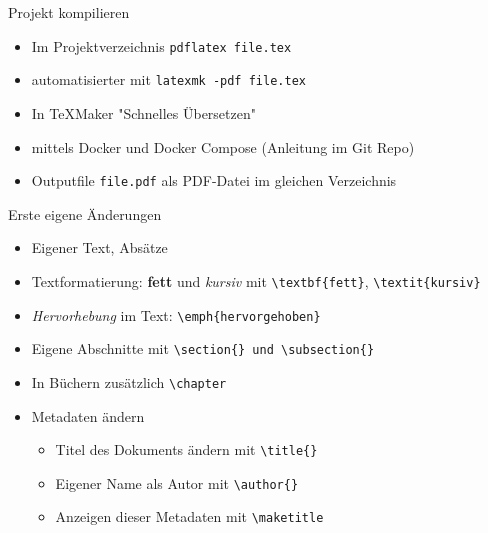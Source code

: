 \documentclass[presentation,aspectratio=169]{beamer}
\begin{document}
\begin{frame}[fragile]{Projekt kompilieren}
  \begin{itemize}
    \item Im Projektverzeichnis \verb|pdflatex file.tex|
    \item automatisierter mit \verb|latexmk -pdf file.tex|
    \item In \TeX{}Maker "Schnelles Übersetzen"
    \item mittels Docker und Docker Compose (Anleitung im Git Repo)
    \item Outputfile \verb|file.pdf| als PDF-Datei im gleichen Verzeichnis
  \end{itemize}
\end{frame}

\begin{frame}[fragile]{Erste eigene Änderungen}
  \begin{itemize}
    \item Eigener Text, Absätze
    \item Textformatierung: \textbf{fett} und \textit{kursiv} mit \verb|\textbf{fett}|, \verb|\textit{kursiv}|
    \item \emph{Hervorhebung} im Text: \verb|\emph{hervorgehoben}|
    \item Eigene Abschnitte mit \verb|\section{} und \subsection{}|
    \item In Büchern zusätzlich \verb|\chapter|
    \item Metadaten ändern
      \begin{itemize}
        \item Titel des Dokuments ändern mit \verb|\title{}|
        \item Eigener Name als Autor mit \verb|\author{}|
        \item Anzeigen dieser Metadaten mit \verb|\maketitle|
      \end{itemize}
  \end{itemize}
\end{frame}
\end{document}
